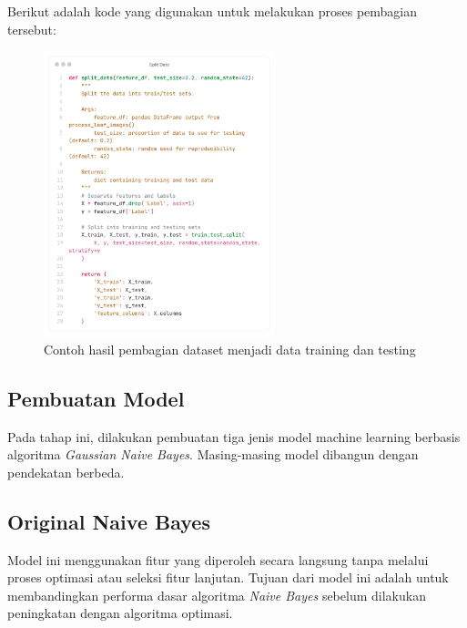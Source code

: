 Berikut adalah kode yang digunakan untuk melakukan proses pembagian tersebut:

\begin{figure}[H]
  \centering
  \includegraphics[width=0.6\textwidth]{figure/chapter-4-split_data.png}
  \caption{Contoh hasil pembagian dataset menjadi data training dan testing}
  \label{fig:extract_rgb}
\end{figure}



\subsection{Pembuatan Model} \label{IV.Pembuatan Model}
Pada tahap ini, dilakukan pembuatan tiga jenis model machine learning berbasis algoritma \textit{Gaussian Naive Bayes}. Masing-masing model dibangun dengan pendekatan berbeda.

\subsection{Original Naive Bayes} \label{IV.Original Naïve Bayes}
Model ini menggunakan fitur yang diperoleh secara langsung tanpa melalui proses optimasi atau seleksi fitur lanjutan. Tujuan dari model ini adalah untuk membandingkan performa dasar algoritma \textit{Naive Bayes} sebelum dilakukan peningkatan dengan algoritma optimasi.

